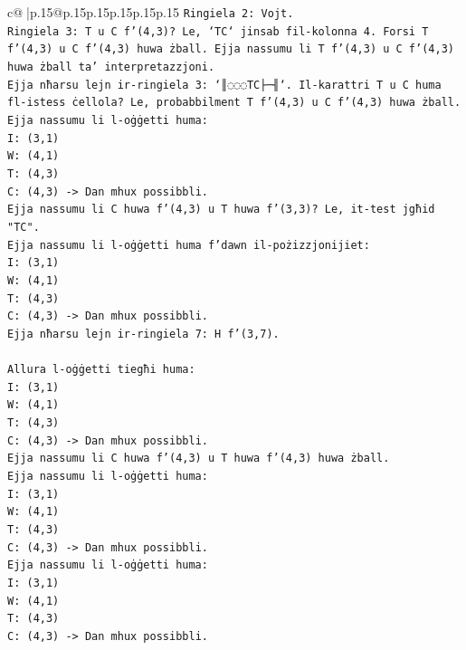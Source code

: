 \documentclass{article}
\begin{document}
{\begin{supertabular}{c@{$\;$}|p{.15\linewidth}@{}p{.15\linewidth}p{.15\linewidth}p{.15\linewidth}p{.15\linewidth}p{.15\linewidth}}
{{{\texttt{Ringiela 2: Vojt.} \\
\texttt{Ringiela 3: T u C f'(4,3)? Le, `TC` jinsab fil{-}kolonna 4. Forsi T f'(4,3) u C f'(4,3) huwa żball. Ejja nassumu li T f'(4,3) u C f'(4,3) huwa żball ta' interpretazzjoni.} \\
\texttt{Ejja nħarsu lejn ir{-}ringiela 3: `║◌◌◌TC├─╢`. Il{-}karattri T u C huma fl{-}istess ċellola? Le, probabbilment T f'(4,3) u C f'(4,3) huwa żball.} \\
\texttt{Ejja nassumu li l{-}oġġetti huma:} \\
\texttt{I: (3,1)} \\
\texttt{W: (4,1)} \\
\texttt{T: (4,3)} \\
\texttt{C: (4,3) {-}> Dan mhux possibbli.} \\
\texttt{Ejja nassumu li C huwa f'(4,3) u T huwa f'(3,3)? Le, it{-}test jgħid "TC".} \\
\texttt{Ejja nassumu li l{-}oġġetti huma f'dawn il{-}pożizzjonijiet:} \\
\texttt{I: (3,1)} \\
\texttt{W: (4,1)} \\
\texttt{T: (4,3)} \\
\texttt{C: (4,3) {-}> Dan mhux possibbli.} \\
\texttt{Ejja nħarsu lejn ir{-}ringiela 7: H f'(3,7).} \\
\\ 
\texttt{Allura l{-}oġġetti tiegħi huma:} \\
\texttt{I: (3,1)} \\
\texttt{W: (4,1)} \\
\texttt{T: (4,3)} \\
\texttt{C: (4,3) {-}> Dan mhux possibbli.} \\
\texttt{Ejja nassumu li C huwa f'(4,3) u T huwa f'(4,3) huwa żball.} \\
\texttt{Ejja nassumu li l{-}oġġetti huma:} \\
\texttt{I: (3,1)} \\
\texttt{W: (4,1)} \\
\texttt{T: (4,3)} \\
\texttt{C: (4,3) {-}> Dan mhux possibbli.} \\
\texttt{Ejja nassumu li l{-}oġġetti huma:} \\
\texttt{I: (3,1)} \\
\texttt{W: (4,1)} \\
\texttt{T: (4,3)} \\
\texttt{C: (4,3) {-}> Dan mhux possibbli.} \\
}}}
\end{supertabular}}
\end{document}
